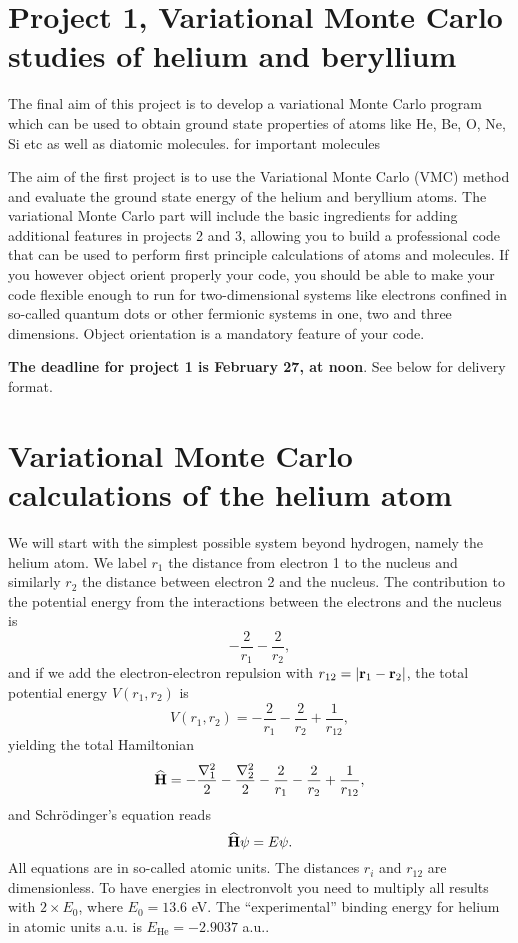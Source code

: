 \documentclass[10pt]{article}
\newcommand{\be}{\begin{equation}}
\newcommand{\ee}{\end{equation}}
\newcommand{\OP}[1]{{\bf\widehat{#1}}}
\begin{document}
\section*{Project 1, Variational Monte Carlo studies of helium and beryllium}

The final aim of this project is to develop a variational Monte Carlo program which can be used to obtain ground state properties of atoms like He, Be, O, Ne, Si etc as well as diatomic molecules. 
for important molecules 

The aim of the first project  is to use the Variational Monte
Carlo (VMC) method and evaluate 
the ground state energy of  the
helium and beryllium atoms. The variational Monte Carlo part will include the basic ingredients for adding additional features in projects 2 and 3, allowing you to build a professional code that can be used to perform first principle calculations of atoms and molecules.
If you however object orient properly your code, 
you should be able to make your code flexible enough to run for two-dimensional systems like electrons confined in so-called quantum dots or other fermionic systems in one, two and three dimensions.  Object orientation is a mandatory feature of your code. 

{\bf The deadline for project 1 is February 27, at noon}.  See below for delivery format.

\section*{Variational Monte Carlo calculations of the helium atom}

We will start with the simplest possible system beyond hydrogen, namely the helium atom.
We label $r_1$ the distance from electron 1 to the nucleus and similarly 
$r_2$ the distance between electron 2 and the nucleus.
The contribution to the potential energy from the interactions between the 
electrons and the nucleus is
\be
   -\frac{2}{r_1}-\frac{2}{r_2},
\ee 
and if we add the electron-electron repulsion with
$r_{12}=|{\bf r}_1-{\bf r}_2|$, the total potential energy 
$V(r_1, r_2)$ is
\be
 V(r_1, r_2)=-\frac{2}{r_1}-\frac{2}{r_2}+
               \frac{1}{r_{12}},
\ee
yielding the total Hamiltonian
\be
   \OP{H}=-\frac{\nabla_1^2}{2}-\frac{\nabla_2^2}{2}
          -\frac{2}{r_1}-\frac{2}{r_2}+
               \frac{1}{r_{12}},
\ee
and Schr\"odinger's equation reads
\be
   \OP{H}\psi=E\psi.
\ee
All equations are in so-called atomic units. The distances
$r_i$ and $r_{12}$ are dimensionless. To have energies in electronvolt
you need to multiply all results with 
$2\times E_0$,
where $E_0=13.6$ eV.
The ``experimental'' binding energy for helium in atomic units a.u. is $E_{\mathrm{He}}=-2.9037$ a.u..
\end{document}
